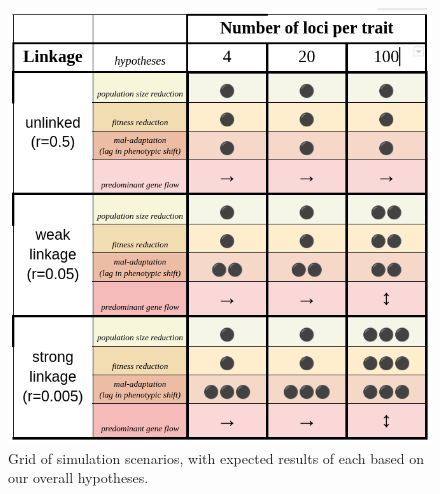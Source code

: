 \documentclass[9pt,twocolumn,twoside,lineno]{pnas-new}
\begin{document}
\begin{figure}%
\centering
\includegraphics[width=.8\linewidth]{hypotheses}
\caption{Grid of simulation scenarios, with expected results of each based on our overall hypotheses.}
\label{tab:hypotheses}
\end{figure}
\end{document}
